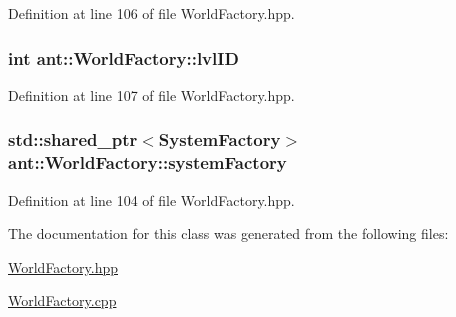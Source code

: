 Definition at line 106 of file World\+Factory.\+hpp.

\hypertarget{classant_1_1_world_factory_a19c196cebb24df1b5679daf87979a53f}{
\subsubsection[{lvl\+I\+D}]{\setlength{\rightskip}{0pt plus 5cm}int ant\+::\+World\+Factory\+::lvl\+I\+D\hspace{0.3cm}{\ttfamily [private]}}}\label{classant_1_1_world_factory_a19c196cebb24df1b5679daf87979a53f}


Definition at line 107 of file World\+Factory.\+hpp.

\hypertarget{classant_1_1_world_factory_adf39cbc46437aee8c7bfbf724b186d8f}{
\subsubsection[{system\+Factory}]{\setlength{\rightskip}{0pt plus 5cm}std\+::shared\+\_\+ptr$<${\bf System\+Factory}$>$ ant\+::\+World\+Factory\+::system\+Factory\hspace{0.3cm}{\ttfamily [private]}}}\label{classant_1_1_world_factory_adf39cbc46437aee8c7bfbf724b186d8f}


Definition at line 104 of file World\+Factory.\+hpp.



The documentation for this class was generated from the following files\+:\begin{DoxyCompactItemize}
\item 
\hyperlink{_world_factory_8hpp}{World\+Factory.\+hpp}\item 
\hyperlink{_world_factory_8cpp}{World\+Factory.\+cpp}\end{DoxyCompactItemize}
